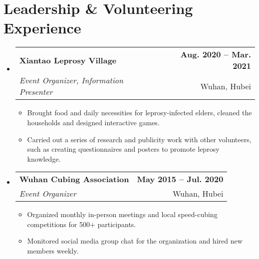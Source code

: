 \documentclass[letterpaper,11pt]{article}
\begin{document}
\section{Leadership \& Volunteering Experience}
\begin{itemize}[nosep,label={},leftmargin=0in]

  \item
  \begin{tabularx}{\textwidth}{Xr@{}}
    \textbf{Xiantao Leprosy Village} & \textbf{Aug. 2020 -- Mar. 2021} \\
    \textit{Event Organizer, Information Presenter} & Wuhan, Hubei
  \end{tabularx}
  \begin{itemize}[nosep]
    \item \small{Brought food and daily necessities for leprosy-infected elders, cleaned the households and designed interactive games.}
    \item \small{Carried out a series of research and publicity work with other volunteers, such as creating questionnaires and posters to promote leprosy knowledge.}
  \end{itemize}

  \item
  \begin{tabularx}{\textwidth}{Xr@{}}
    \textbf{Wuhan Cubing Association} & \textbf{May 2015 -- Jul. 2020} \\
    \textit{Event Organizer} & Wuhan, Hubei
  \end{tabularx}
  \begin{itemize}[nosep]
    \item \small{Organized monthly in-person meetings and local speed-cubing competitions for 500+ participants.}
    \item \small{Monitored social media group chat for the organization and hired new members weekly.}
  \end{itemize}
  
\end{itemize}
\end{document}
